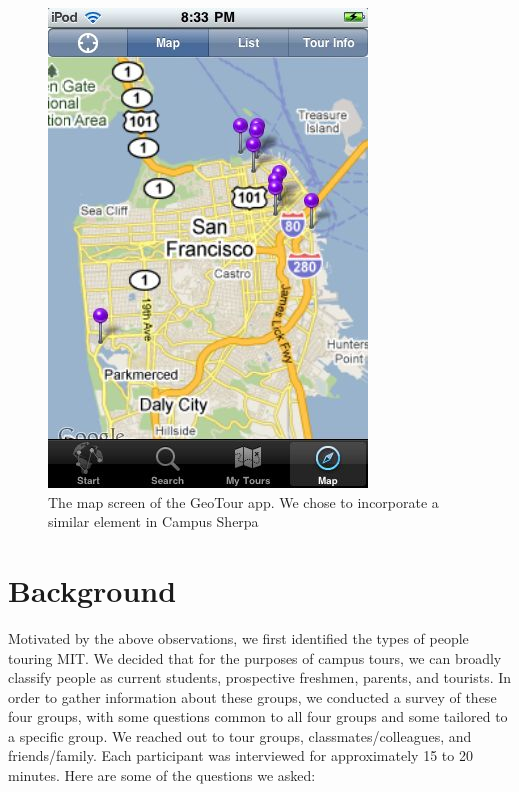 \documentclass{sigchi}
\begin{document}
\begin{figure}[h!]
\centering
\includegraphics[width=1.0\linewidth]{./GeoTour}
\caption{The map screen of the GeoTour app. We chose to incorporate a similar element in Campus Sherpa}
\label{fig:GeoTour}
\end{figure}

\section{Background}

Motivated by the above observations, we first identified the types of people touring MIT. We decided that for the purposes of campus tours, we can broadly classify people as current students, prospective freshmen, parents, and tourists. In order to gather information about these groups, we conducted a survey of these four groups, with some questions common to all four groups and some tailored to a specific group. We reached out to tour groups, classmates/colleagues, and friends/family. Each participant was interviewed for approximately 15 to 20 minutes. Here are some of the questions we asked:
\end{document}
